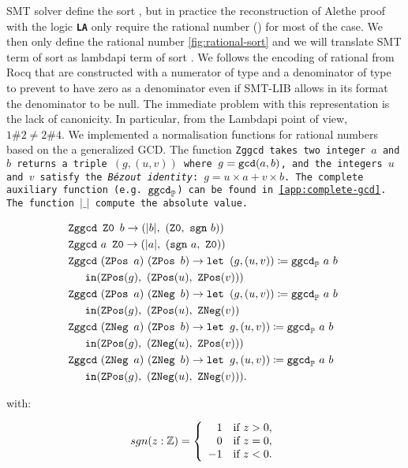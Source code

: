 SMT solver define the sort , but in practice the reconstruction of Alethe proof with the logic \textbf{\tt{LA}}
only require the rational number (\Q) for most of the case. We then only define the rational number \cref{fig:rational-sort} and we will translate SMT
term of sort  as lambdapi term of sort {\Q}. We follows the encoding of rational from Rocq \cite{Rocq-refman} that are constructed with a numerator of type {\Z} and a denominator of type {\PP} to prevent
to have zero as a denominator even if SMT-LIB allows in its format the denominator to be null. The immediate problem with this representation is the lack of canonicity.
In particular, from the Lambdapi point of view, $1 \# 2 \neq 2 \# 4$. We implemented a normalisation functions for rational numbers based on the a generalized GCD.
The function \tt{Zggcd} takes two integer $a$ and $b$ returns a triple $(g, (u, v))$ where $g = \tt{gcd}(a, b)$, and the integers $u$ and $v$ satisfy the \emph{Bézout identity}: $g = u \times a + v \times b$.
The complete auxiliary function (e.g. $\tt{ggcd}_\PP$) can be found in \cref{app:complete-gcd}. The function $|\_|$ compute the absolute value.

\begin{definition}[Zggcd]
\begin{align*}
&\tt{Zggcd}~\ZO~b \ra (|b|,~(\ZO,~\tt{sgn}~b)) \\
&\tt{Zggcd}~a~\ZO \ra (|a|,~(\tt{sgn}~a,~\ZO)) \\
&\tt{Zggcd}~(\ZPos~a)~(\ZPos~b) \ra \tt{let } (g,(u,v)) \coloneqq \tt{ggcd}_\PP~a~b~ \\
&\quad \tt{ in} (\ZPos(g),~(\ZPos(u),~\ZPos(v))) \\
&\tt{Zggcd}~(\ZPos~a)~(\ZNeg~b) \ra \tt{let } (g,(u,v)) \coloneqq \tt{ggcd}_\PP~a~b~ \\
&\quad \tt{ in} (\ZPos(g),~(\ZPos(u),~\ZNeg(v)) \\
&\tt{Zggcd}~(\ZNeg~a)~(\ZPos~b) \ra \tt{let } g,(u,v)) \coloneqq \tt{ggcd}_\PP~a~b~ \\
&\quad \tt{ in} (\ZPos(g),~(\ZNeg(u),~\ZPos(v))) \\
&\tt{Zggcd}~(\ZNeg~a)~(\ZNeg~b) \ra \tt{let } g,(u,v)) \coloneqq \tt{ggcd}_\PP~a~b~\\
&\quad \tt{ in} (\ZPos(g),~(\ZNeg(u),~\ZNeg(v))).
\end{align*}

with:

\[
\mathop{sgn}(z: \Z) = 
\left\{
\begin{array}{ll}
\phantom{-}1 & \text{if } z > 0, \\
\phantom{-}0 & \text{if } z = 0, \\
-1 & \text{if } z < 0.
\end{array}
\right.
\]
\end{definition}

